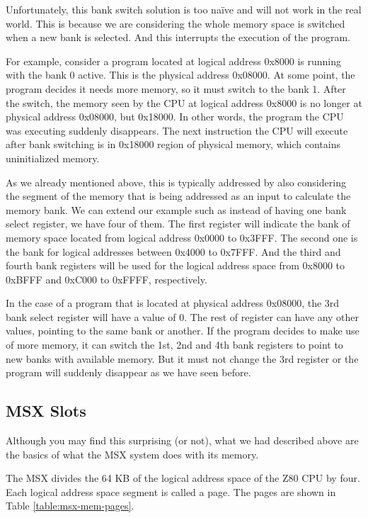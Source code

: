 Unfortunately, this bank switch solution is too naïve and will not work in the real world. This is because we are considering the whole memory space is switched when a new bank is selected. And this interrupts the execution of the program. 

For example, consider a program located at logical address 0x8000 is running with the bank 0 active. This is the physical address 0x08000. At some point, the program decides it needs more memory, so it must switch to the bank 1. After the switch, the memory seen by the CPU at logical address 0x8000 is no longer at physical address 0x08000, but 0x18000. In other words, the program the CPU was executing suddenly disappears. The next instruction the CPU will execute after bank switching is in 0x18000 region of physical memory, which contains uninitialized memory. 

As we already mentioned above, this is typically addressed by also considering the segment of the memory that is being addressed as an input to calculate the memory bank. We can extend our example such as instead of having one bank select register, we have four of them. The first register will indicate the bank of memory space located from logical address 0x0000 to 0x3FFF. The second one is the bank for logical addresses between 0x4000 to 0x7FFF. And the third and fourth bank registers will be used for the logical address space from 0x8000 to 0xBFFF and 0xC000 to 0xFFFF, respectively. 

In the case of a program that is located at physical address 0x08000, the 3rd bank select register will have a value of 0. The rest of register can have any other values, pointing to the same bank or another. If the program decides to make use of more memory, it can switch the 1st, 2nd and 4th bank registers to point to new banks with available memory. But it must not change the 3rd register or the program will suddenly disappear as we have seen before. 

\subsection{MSX Slots}

Although you may find this surprising (or not), what we had described above are the basics of what the MSX system does with its memory.

The MSX divides the 64 KB of the logical address space of the Z80 CPU by four. Each logical address space segment is called a page. The pages are shown in Table \ref{table:msx-mem-pages}.

